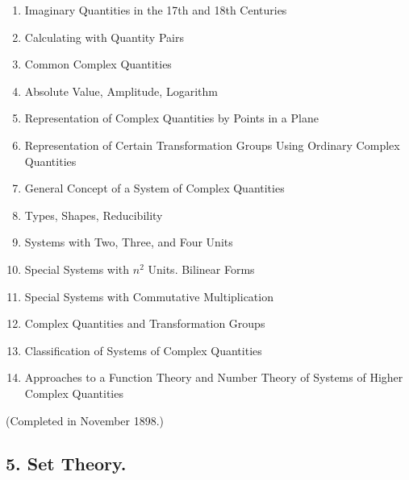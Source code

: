 \begin{enumerate}[itemsep=0pt]
    \item Imaginary Quantities in the 17th and 18th Centuries
    \item Calculating with Quantity Pairs
    \item Common Complex Quantities
    \item Absolute Value, Amplitude, Logarithm
    \item Representation of Complex Quantities by Points in a Plane
    \item Representation of Certain Transformation Groups Using Ordinary Complex Quantities
    \item General Concept of a System of Complex Quantities
    \item Types, Shapes, Reducibility
    \item Systems with Two, Three, and Four Units
    \item Special Systems with $n^2$ Units. Bilinear Forms
    \item Special Systems with Commutative Multiplication
    \item Complex Quantities and Transformation Groups
    \item Classification of Systems of Complex Quantities
    \item Approaches to a Function Theory and Number Theory of Systems of Higher Complex Quantities
\end{enumerate}

\vspace{-0.1cm}
{\normalfont(Completed in November 1898.)}

\subsection*{\small5. Set Theory. }

